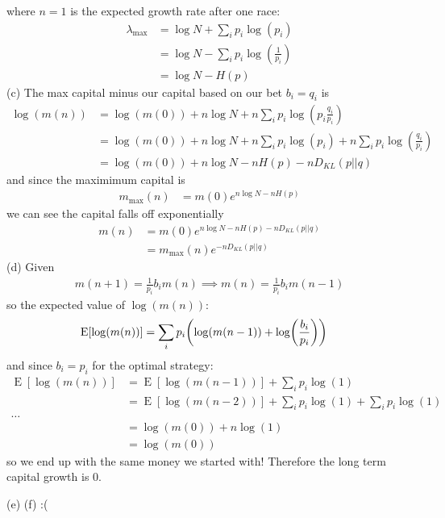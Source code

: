 \documentclass[../main.tex]{subfiles}
\newcommand{\E}{\operatorname{E}}
\begin{document}
where $n = 1$ is the expected growth rate after one race:
\begin{align*}
    \lambda_{\text{max}} &= \log N + \sum_i p_i \log(p_i) \\
    &= \log N - \sum_i p_i \log(\frac{1}{p_i}) \\
    &= \log N - H(p)
\end{align*}
(c) The max capital minus our capital based on our bet $b_i = q_i$ is
\begin{align*}
    \log(m(n)) &= \log(m(0)) + n \log N + n \sum_i p_i \log(p_i \frac{q_i}{p_i}) \\
    &= \log(m(0)) + n \log N + n \sum_i p_i \log(p_i) + n \sum_i p_i \log(\frac{q_i}{p_i}) \\
    &= \log(m(0)) + n \log N - n H(p) - n D_{KL}(p||q)
\end{align*}
and since the maximimum capital is
\begin{align*}
    m_{\text{max}}(n) &= m(0) e^{n \log N - n H(p)}
\end{align*}
we can see the capital falls off exponentially
\begin{align*}
    m(n) &= m(0) e^{n \log N - n H(p) - n D_{KL}(p||q)} \\
    &= m_{\text{max}}(n) e^{-n D_{KL}(p||q)}
\end{align*}
(d) Given
\begin{align*}
    m(n + 1) = \frac{1}{p_i} b_i m(n) \implies m(n) = \frac{1}{p_i} b_i m(n - 1)
\end{align*}
so the expected value of $\log(m(n))$:
\begin{align*}
    \E[\log(m(n))] &= \sum_i p_i \qt(\log(m(n - 1)) + \log(\frac{b_i}{p_i}))
\end{align*}
and since $b_i = p_i$ for the optimal strategy:
\begin{align*}
    \E[\log(m(n))] &= \E[\log(m(n - 1))] + \sum_i p_i \log(1) \\
    &= \E[\log(m(n - 2))] + \sum_i p_i \log(1) + \sum_i p_i \log(1) \\
    \dots \\
    &= \log(m(0)) + n \log(1) \\
    &= \log(m(0))
\end{align*}
so we end up with the same money we started with! Therefore the long term capital growth is 0.

(e) (f) :(
\end{document}
